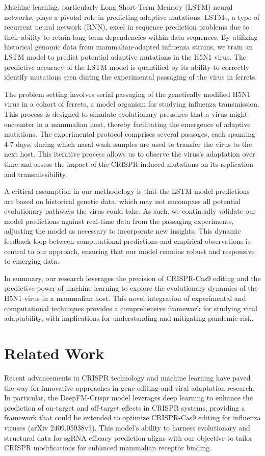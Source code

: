 \documentclass{article}
\begin{document}
Machine learning, particularly Long Short-Term Memory (LSTM) neural networks, plays a pivotal role in predicting adaptive mutations. LSTMs, a type of recurrent neural network (RNN), excel in sequence prediction problems due to their ability to retain long-term dependencies within data sequences. By utilizing historical genomic data from mammalian-adapted influenza strains, we train an LSTM model to predict potential adaptive mutations in the H5N1 virus. The predictive accuracy of the LSTM model is quantified by its ability to correctly identify mutations seen during the experimental passaging of the virus in ferrets. 

The problem setting involves serial passaging of the genetically modified H5N1 virus in a cohort of ferrets, a model organism for studying influenza transmission. This process is designed to simulate evolutionary pressures that a virus might encounter in a mammalian host, thereby facilitating the emergence of adaptive mutations. The experimental protocol comprises several passages, each spanning 4-7 days, during which nasal wash samples are used to transfer the virus to the next host. This iterative process allows us to observe the virus's adaptation over time and assess the impact of the CRISPR-induced mutations on its replication and transmissibility.

A critical assumption in our methodology is that the LSTM model predictions are based on historical genetic data, which may not encompass all potential evolutionary pathways the virus could take. As such, we continually validate our model predictions against real-time data from the passaging experiments, adjusting the model as necessary to incorporate new insights. This dynamic feedback loop between computational predictions and empirical observations is central to our approach, ensuring that our model remains robust and responsive to emerging data.

In summary, our research leverages the precision of CRISPR-Cas9 editing and the predictive power of machine learning to explore the evolutionary dynamics of the H5N1 virus in a mammalian host. This novel integration of experimental and computational techniques provides a comprehensive framework for studying viral adaptability, with implications for understanding and mitigating pandemic risk.

\section{Related Work}
Recent advancements in CRISPR technology and machine learning have paved the way for innovative approaches in gene editing and viral adaptation research. In particular, the DeepFM-Crispr model leverages deep learning to enhance the prediction of on-target and off-target effects in CRISPR systems, providing a framework that could be extended to optimize CRISPR-Cas9 editing for influenza viruses (arXiv 2409.05938v1). This model's ability to harness evolutionary and structural data for sgRNA efficacy prediction aligns with our objective to tailor CRISPR modifications for enhanced mammalian receptor binding.
\end{document}
